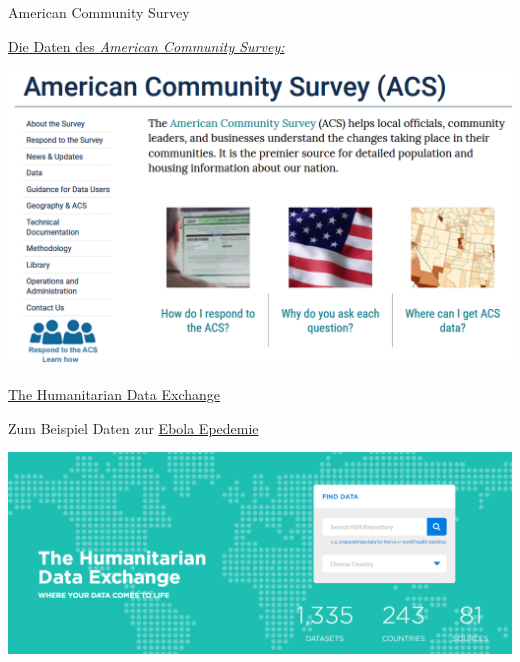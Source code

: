 \documentclass[ignorenonframetext,]{beamer}
\begin{document}
\begin{frame}{American Community Survey}
\protect\hypertarget{american-community-survey}{}

\begin{block}{\href{http://www.census.gov/acs/www/}{Die Daten des
\emph{American Community Survey:}}}

\includegraphics{figure/ACS.PNG}

\end{block}

\end{frame}

\begin{frame}{\href{data.hdx.rwlabs.org}{The Humanitarian Data
Exchange}}
\protect\hypertarget{the-humanitarian-data-exchange}{}

\begin{block}{Zum Beispiel Daten zur
\href{https://data.hdx.rwlabs.org/dataset/rowca-ebola-cases}{Ebola
Epedemie}}

\includegraphics{figure/HDx.PNG}

\end{block}

\end{frame}
\end{document}
